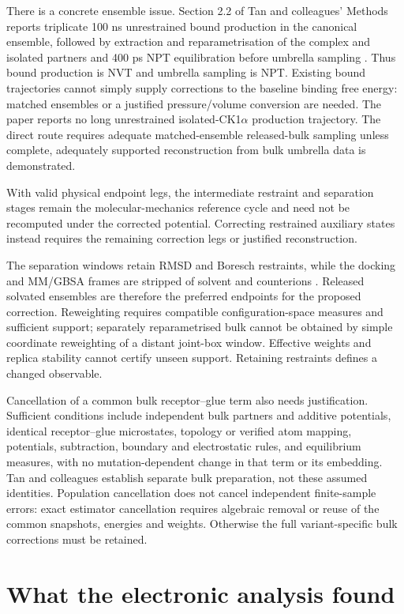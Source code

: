 \documentclass{article}
\begin{document}
There is a concrete ensemble issue. Section 2.2 of Tan and colleagues' Methods reports triplicate 100 ns unrestrained bound production in the canonical ensemble, followed by extraction and reparametrisation of the complex and isolated partners and 400 ps NPT equilibration before umbrella sampling \cite{Q}. Thus bound production is NVT and umbrella sampling is NPT. Existing bound trajectories cannot simply supply corrections to the baseline binding free energy: matched ensembles or a justified pressure/volume conversion are needed. The paper reports no long unrestrained isolated-CK1\(\alpha\) production trajectory. The direct route requires adequate matched-ensemble released-bulk sampling unless complete, adequately supported reconstruction from bulk umbrella data is demonstrated.

With valid physical endpoint legs, the intermediate restraint and separation stages remain the molecular-mechanics reference cycle and need not be recomputed under the corrected potential. Correcting restrained auxiliary states instead requires the remaining correction legs or justified reconstruction.

The separation windows retain RMSD and Boresch restraints, while the docking and MM/GBSA frames are stripped of solvent and counterions \cite{Q}. Released solvated ensembles are therefore the preferred endpoints for the proposed correction. Reweighting requires compatible configuration-space measures and sufficient support; separately reparametrised bulk cannot be obtained by simple coordinate reweighting of a distant joint-box window. Effective weights and replica stability cannot certify unseen support. Retaining restraints defines a changed observable.

Cancellation of a common bulk receptor--glue term also needs justification. Sufficient conditions include independent bulk partners and additive potentials, identical receptor--glue microstates, topology or verified atom mapping, potentials, subtraction, boundary and electrostatic rules, and equilibrium measures, with no mutation-dependent change in that term or its embedding. Tan and colleagues establish separate bulk preparation, not these assumed identities. Population cancellation does not cancel independent finite-sample errors: exact estimator cancellation requires algebraic removal or reuse of the common snapshots, energies and weights. Otherwise the full variant-specific bulk corrections must be retained.

\section{What the electronic analysis found}
\end{document}
